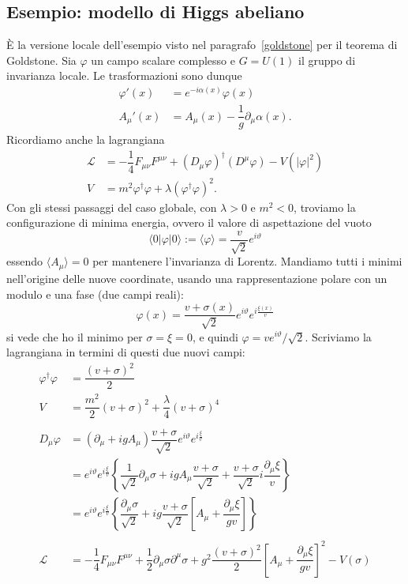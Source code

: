 \documentclass[italian,a4paper]{article}
\theoremstyle{definition}
\newcommand{\lagr}{\ensuremath{\mathscr{L}}}
\newcommand{\dimu}{\ensuremath{\partial_{\mu}}}
\newcommand{\Dimu}{\ensuremath{D_{\mu}}}
\renewcommand{\theta}{\vartheta}
\begin{document}
\subsection*{Esempio: modello di Higgs abeliano}
\`E la versione locale dell'esempio visto nel
paragrafo~\ref{goldstone} per il teorema di Goldstone. Sia $\varphi$ un
campo scalare complesso e $G = U(1)$ il gruppo di invarianza locale. Le
trasformazioni sono dunque
\begin{align*}
    \varphi'(x) &= e^{-i \alpha(x)}\varphi(x)\\
    A_\mu'(x) &= A_\mu(x) - \dfrac{1}{g}\partial_\mu \alpha(x).
\end{align*}
Ricordiamo anche la lagrangiana
\begin{align*}
    \lagr &= -\dfrac{1}{4}F_{\mu\nu}F^{\mu\nu} + (D_\mu\varphi)^\dagger(D^\mu
    \varphi) - V(|\varphi|^2)\\
    V &= m^2 \varphi^\dagger \varphi + \lambda (\varphi^\dagger \varphi)^2.
\end{align*}
Con gli stessi passaggi del caso globale, con $\lambda > 0$ e $m^2 <0$,
troviamo la configurazione di minima energia, ovvero il valore di
aspettazione del vuoto
\begin{equation*}
    \langle 0 \vert \varphi \vert 0 \rangle \mathop:= \langle \varphi
    \rangle = \dfrac{v}{\sqrt{2}}e^{i\theta}
\end{equation*}
essendo $\langle A_\mu \rangle = 0$ per mantenere l'invarianza di Lorentz.
Mandiamo tutti i minimi nell'origine delle nuove coordinate, usando una
rappresentazione polare con un modulo e una fase (due campi reali):
\begin{equation*}
    \varphi(x) = \dfrac{v +
    \sigma(x)}{\sqrt{2}}e^{i\theta}e^{i\frac{\xi(x)}{v}}
\end{equation*}
si vede che ho il minimo per $\sigma = \xi = 0$, e quindi $\varphi =
ve^{i\theta}/\sqrt{2}$. Scriviamo la lagrangiana in termini di questi due
nuovi campi:
\begin{align*}
    \varphi^\dagger \varphi &= \dfrac{(v + \sigma)^2}{2}\\
    V &= \dfrac{m^2}{2}(v + \sigma)^2 + \dfrac{\lambda}{4}(v + \sigma)^4\\
    \\
    \Dimu \varphi &= (\dimu + i g A_{\mu}) \dfrac{v +
    \sigma}{\sqrt{2}}e^{i\theta}e^{i\frac{\xi}{v}}\\
    &= e^{i\theta}e^{i\frac{\xi}{v}}
    \left\{
    \dfrac{1}{\sqrt{2}}\dimu \sigma 
    + i g A_\mu \dfrac{v + \sigma}{\sqrt{2}}
    + \dfrac{v + \sigma}{\sqrt{2}} i\dfrac{\dimu \xi}{v}\right\}\\
    &= e^{i\theta}e^{i\frac{\xi}{v}}
    \left\{
    \dfrac{\dimu \sigma}{\sqrt{2}}
    + i g \dfrac{v + \sigma}{\sqrt{2}} \left[ A_\mu + \dfrac{\dimu \xi}{gv}\right]
    \right\}\\
    \\
    \lagr &= -\dfrac{1}{4}F_{\mu\nu}F^{\mu\nu}
    + \dfrac{1}{2}\partial_\mu \sigma \partial^\mu \sigma
    + g^2 \dfrac{(v + \sigma)^2}{2}\left[ A_{\mu} + \dfrac{\dimu
    \xi}{gv}\right]^2 - V(\sigma)
\end{align*}
\end{document}
